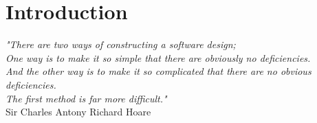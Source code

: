 \clearpage{\pagestyle{empty}\cleardoublepage}
\chapter*{Introduction}

\begin{flushright}\begin{small}\textit{"There are two ways of constructing a software design;\\One way is to make it so simple that there are obviously no deficiencies.\\And the other way is to make it so complicated that there are no obvious deficiencies.\\The first method is far more difficult."}\\
Sir Charles Antony Richard Hoare\\
\end{small}\end{flushright}

